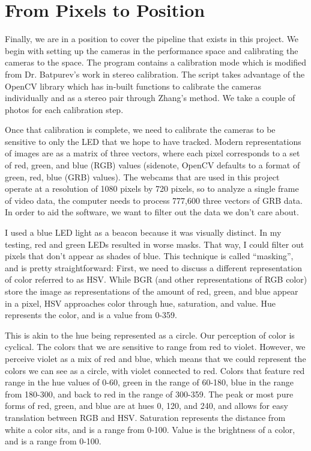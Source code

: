 \documentclass[
    12pt,
    twoside,
    bibstyle=chicago,
    headerstyle=uppercase,
	bibfile=biblatex_updating.bib
]{reedthesis}
\begin{document}
\section{From Pixels to Position}
Finally, we are in a position to cover the pipeline that exists in this project. We begin with setting up the cameras in the performance space and calibrating the cameras to the space. The program contains a calibration mode which is modified from Dr. Batpurev's work in stereo calibration\autocite{batpurevStereoCameraCalibration2021}. The script takes advantage of the OpenCV library which has in-built functions to calibrate the cameras individually and as a stereo pair through Zhang's method. We take a couple of photos for each calibration step.

Once that calibration is complete, we need to calibrate the cameras to be sensitive to only the LED that we hope to have tracked. Modern representations of images are as a matrix of three vectors, where each pixel corresponds to a set of red, green, and blue (RGB) values (sidenote, OpenCV defaults to a format of green, red, blue (GRB) values). The webcams that are used in this project operate at a resolution of 1080 pixels by 720 pixels, so to analyze a single frame of video data, the computer needs to process 777,600 three vectors of GRB data. In order to aid the software, we want to filter out the data we don't care about.

I used a blue LED light as a beacon because it was visually distinct. In my testing, red and green LEDs resulted in worse masks. That way, I could filter out pixels that don't appear as shades of blue. This technique is called “masking”, and is pretty straightforward: First, we need to discuss a different representation of color referred to as HSV. While BGR (and other representations of RGB color) store the image as representations of the amount of red, green, and blue appear in a pixel, HSV approaches color through hue, saturation, and value. Hue represents the color, and is a value from 0-359. 

This is akin to the hue being represented as a circle. Our perception of color is cyclical. The colors that we are sensitive to range from red to violet. However, we perceive violet as a mix of red and blue, which means that we could represent the colors we can see as a circle, with violet connected to red. Colors that feature red range in the hue values of 0-60, green in the range of 60-180, blue in the range from 180-300, and back to red in the range of 300-359. The peak or most pure forms of red, green, and blue are at hues 0, 120, and 240, and allows for easy translation between RGB and HSV. Saturation represents the distance from white a color sits, and is a range from 0-100. Value is the brightness of a color, and is a range from 0-100.
\end{document}
